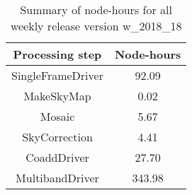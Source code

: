 \begin{table}[h]
  \centering
  \begin{tabular} {|c|c|}
    \hline
    Processing step & Node-hours \\
    \hline
    SingleFrameDriver &  92.09 \\ 
    MakeSkyMap        &   0.02 \\
    Mosaic            &   5.67 \\
    SkyCorrection     &   4.41 \\
    CoaddDriver       &  27.70 \\
    MultibandDriver   & 343.98 \\
    \hline
  \end{tabular}
  \caption{Summary of node-hours for all weekly release version w\_2018\_18}
  \label{tbl:PerTask18}
\end{table}
